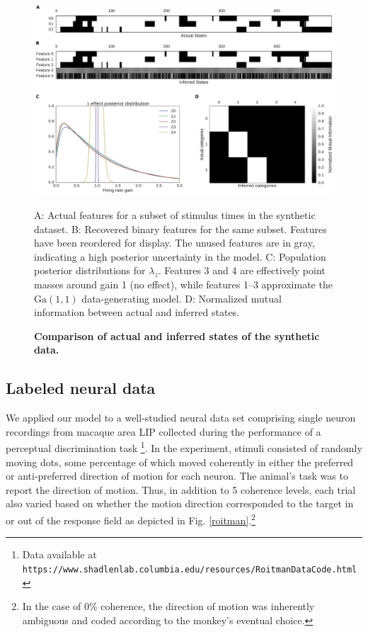 \documentclass[10pt,letterpaper]{article}
\begin{document}
\begin{figure}[!h]
    \includegraphics[width=\linewidth]{figures/synthetic}
	\caption{\bf Comparison of actual and inferred states of the synthetic data.} A: Actual features for a subset of stimulus times in the synthetic dataset. B: Recovered binary features for the same subset. Features have been reordered for display. The unused features are in gray, indicating a high posterior uncertainty in the model. C: Population posterior distributions for $\lambda_z$. Features 3 and 4 are effectively point masses around gain 1 (no effect), while features 1--3 approximate the $\text{Ga}(1, 1)$ data-generating model. D: Normalized mutual information between actual and inferred states.
	\label{synthetic}
\end{figure}


\subsection*{Labeled neural data}
We applied our model to a well-studied neural data set comprising single neuron recordings from macaque area LIP collected during the performance of a perceptual discrimination task \cite{roitman2002response}\footnote{Data available at \texttt{https://www.shadlenlab.columbia.edu/resources/RoitmanDataCode.html}}. In the experiment, stimuli consisted of randomly moving dots, some percentage of which moved coherently in either the preferred or anti-preferred direction of motion for each neuron. The animal's task was to report the direction of motion. Thus, in addition to 5 coherence levels, each trial also varied based on whether the motion direction corresponded to the target in or out of the response field as depicted in Fig. \ref{roitman}.\footnote{In the case of 0\% coherence, the direction of motion was inherently ambiguous and coded according to the monkey's eventual choice.}
\end{document}
